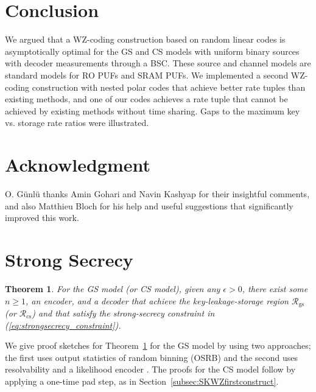 \documentclass[journal,10pt,twoside]{IEEEtran}
\newtheorem{theorem}{Theorem}
\begin{document}
\section{Conclusion}
We argued that a WZ-coding construction based on random linear codes is asymptotically optimal for the GS and CS models with uniform binary sources with decoder measurements through a BSC. These source and channel models are standard models for RO PUFs and SRAM PUFs. We implemented a second WZ-coding construction with nested polar codes that achieve better rate tuples than existing methods, and one of our codes achieves a rate tuple that cannot be achieved by existing methods without time sharing. Gaps to the maximum key vs. storage rate ratios were illustrated. 
\section*{Acknowledgment}
O. G\"unl\"u thanks Amin Gohari and Navin Kashyap for their insightful comments, and also Matthieu Bloch for his help and useful suggestions that significantly improved this work.   

\appendices


\section{Strong Secrecy}\label{app:strongsecrecy}
\begin{theorem}\label{theo:strongsecrecy}
	For the GS model (or CS model), given any $\epsilon>0$, there exist some $n\geq 1$, an encoder, and a decoder that achieve the key-leakage-storage region $\mathcal{R}_{\text{gs}}$ (or $\mathcal{R}_{\text{cs}}$) and that satisfy the strong-secrecy constraint in (\ref{eq:strongsecrecy_constraint}). 
\end{theorem}

We give proof sketches for Theorem~\ref{theo:strongsecrecy} for the GS model by using two approaches; the first uses output statistics of random binning (OSRB) \cite{OSRBAmin} and the second uses resolvability \cite{GerhardDivergence} and a likelihood encoder \cite{LikelihoodEncoder}. The proofs for the CS model follow by applying a one-time pad step, as in Section~\ref{subsec:SKWZfirstconstruct}.
\end{document}
